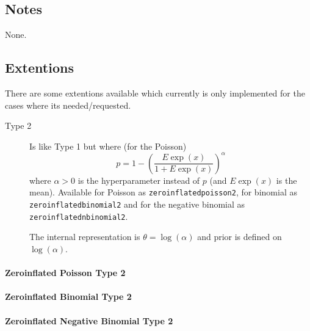 \documentclass[a4paper,11pt]{article}
\begin{document}
\subsection*{Notes}

None.




\subsection*{Extentions}

There are some extentions available which currently is only
implemented for the cases where its needed/requested.
\begin{description}
\item[Type 2] Is like Type 1 but where (for the Poisson)
    \begin{displaymath}
        p = 1-\left( \frac{E\exp(x)}{1 + E\exp(x)}\right)^{\alpha}
    \end{displaymath}
    where $\alpha > 0$ is the hyperparameter instead of $p$ (and
    $E\exp(x)$ is the mean).  Available for Poisson as
    \texttt{zeroinflatedpoisson2}, for binomial as
    \texttt{zeroinflatedbinomial2} and for the negative binomial as
    \texttt{zeroinflatednbinomial2}.

    The internal representation is $\theta = \log(\alpha)$ and prior
    is defined on $\log(\alpha)$.
\end{description}

\paragraph{Zeroinflated Poisson Type 2}


\paragraph{Zeroinflated Binomial Type 2}


\paragraph{Zeroinflated Negative Binomial Type 2}

\end{document}
